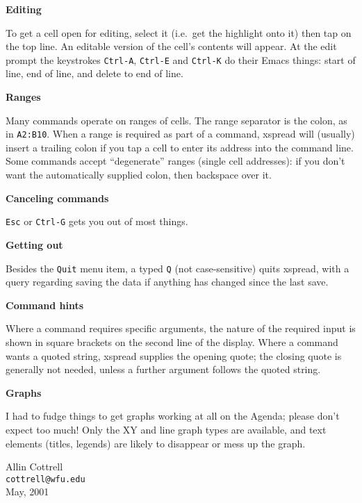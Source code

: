 \documentclass{article}
\newcommand{\myhead}[1]{\vspace{6pt}\noindent\textbf{#1}}
\begin{document}
\myhead{Editing}

To get a cell open for editing, select it (i.e.\ get the highlight
onto it) then tap on the top line.  An editable version of the cell's
contents will appear.  At the edit prompt the keystrokes
\texttt{Ctrl-A}, \texttt{Ctrl-E} and \texttt{Ctrl-K} do their Emacs
things: start of line, end of line, and delete to end of line.

\myhead{Ranges}

Many commands operate on ranges of cells.  The range separator is the
colon, as in \texttt{A2:B10}.  When a range is required as part of a
command, \textsf{xspread} will (usually) insert a trailing colon if
you tap a cell to enter its address into the command line.  Some
commands accept ``degenerate'' ranges (single cell addresses): if you
don't want the automatically supplied colon, then backspace over it.

\myhead{Canceling commands}

\texttt{Esc} or \texttt{Ctrl-G} gets you out of most things.

\myhead{Getting out}

Besides the \texttt{Quit} menu item, a typed \texttt{Q} (not
case-sensitive) quits \textsf{xspread}, with a query regarding saving
the data if anything has changed since the last save.

\myhead{Command hints}

Where a command requires specific arguments, the nature of the
required input is shown in square brackets on the second line of the
display.  Where a command wants a quoted string, \textsf{xspread}
supplies the opening quote; the closing quote is generally not needed,
unless a further argument follows the quoted string.

\myhead{Graphs}

I had to fudge things to get graphs working at all on the Agenda;
please don't expect too much!  Only the XY and line graph types are
available, and text elements (titles, legends) are likely to disappear
or mess up the graph.  

\vspace{8pt}

\begin{raggedleft}
Allin Cottrell\\
\texttt{cottrell@wfu.edu}\\
May, 2001\\
\end{raggedleft}
\end{document}
